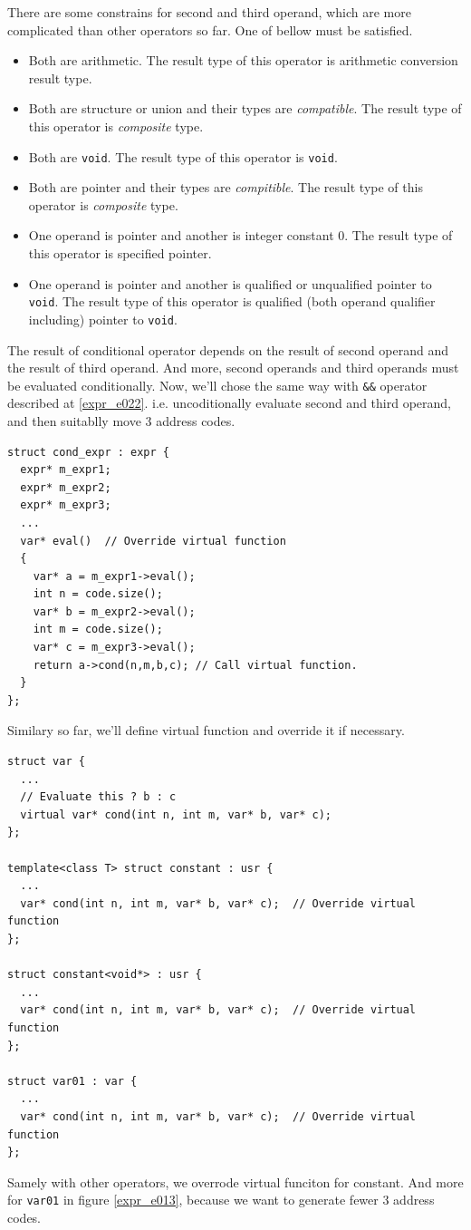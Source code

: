There are some constrains for second and third operand, which are
more complicated than other operators so far. One of bellow must
be satisfied.
\begin{itemize}
\item Both are arithmetic. The result type of this operator
      is arithmetic conversion result type.

\item Both are structure or union and their types are {\em compatible}.
      The result type of this operator is {\em composite} type.

\item Both are {\tt{void}}. The result type of this operator
      is {\tt{void}}.

\item Both are pointer and their types are {\em compitible}.
      The result type of this operator is {\em composite} type.

\item One operand is pointer and another is integer constant 0.
      The result type of this operator is specified pointer.

\item One operand is pointer and another is qualified or unqualified
      pointer to {\tt{void}}. The result type of this operator is
      qualified (both operand qualifier including) pointer to
      {\tt{void}}.
\end{itemize}
The result of conditional operator depends on the result of second 
operand and the result of third operand. And more, second operands
and third operands must be evaluated conditionally. Now, we'll 
chose the same way with {\tt{\&\&}} operator described at
\ref{expr_e022}. i.e. uncoditionally evaluate second and third operand,
and then suitablly move 3 address codes.
\begin{verbatim}
struct cond_expr : expr {
  expr* m_expr1;
  expr* m_expr2;
  expr* m_expr3;
  ...
  var* eval()  // Override virtual function
  {
    var* a = m_expr1->eval();
    int n = code.size();
    var* b = m_expr2->eval();
    int m = code.size();
    var* c = m_expr3->eval();
    return a->cond(n,m,b,c); // Call virtual function.
  }
};
\end{verbatim}
Similary so far, we'll define virtual function and override it if
necessary.
\begin{verbatim}
struct var {
  ...
  // Evaluate this ? b : c
  virtual var* cond(int n, int m, var* b, var* c);
};

template<class T> struct constant : usr {
  ...
  var* cond(int n, int m, var* b, var* c);  // Override virtual function
};

struct constant<void*> : usr {
  ...
  var* cond(int n, int m, var* b, var* c);  // Override virtual function
};

struct var01 : var {
  ...
  var* cond(int n, int m, var* b, var* c);  // Override virtual function
};
\end{verbatim}
Samely with other operators, we overrode virtual funciton
for constant. And more for {\tt{var01}} in figure \ref{expr_e013},
because we want to generate fewer 3 address codes.

